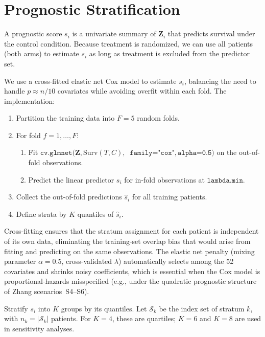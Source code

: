 \documentclass[11pt,letterpaper]{article}
\begin{document}
\section{Prognostic Stratification}

A prognostic score $s_i$ is a univariate summary of $\bm{Z}_i$ that
predicts survival under the control condition.  Because treatment is
randomized, we can use all patients (both arms) to estimate $s_i$ as long
as treatment is excluded from the predictor set.

We use a cross-fitted elastic net Cox model to estimate $s_i$,
balancing the need to handle $p \approx n/10$ covariates while
avoiding overfit within each fold.  The implementation:
\begin{enumerate}
  \item Partition the training data into $F = 5$ random folds.
  \item For fold $f = 1,\dots,F$:
    \begin{enumerate}
      \item Fit $\texttt{cv.glmnet}(\bm{Z}, \text{Surv}(T,C),$
            $\ \texttt{family="cox"}, \texttt{alpha=0.5})$ on the
            out-of-fold observations.
      \item Predict the linear predictor $s_i$ for in-fold
            observations at $\texttt{lambda.min}$.
    \end{enumerate}
  \item Collect the out-of-fold predictions $\widehat{s}_i$ for all
        training patients.
  \item Define strata by $K$ quantiles of $\widehat{s}_i$.
\end{enumerate}
Cross-fitting ensures that the stratum assignment for each patient is
independent of its own data, eliminating the training-set overlap bias
that would arise from fitting and predicting on the same observations.
The elastic net penalty (mixing parameter $\alpha=0.5$, cross-validated
$\lambda$) automatically selects among the 52 covariates and shrinks
noisy coefficients, which is essential when the Cox model is
proportional-hazards misspecified (e.g., under the quadratic prognostic
structure of Zhang scenarios~S4--S6).

Stratify $s_i$ into $K$ groups by its quantiles.  Let $\mathcal{S}_k$
be the index set of stratum $k$, with $n_k = |\mathcal{S}_k|$ patients.
For $K = 4$, these are quartiles; $K = 6$ and $K = 8$ are used in
sensitivity analyses.
\end{document}
